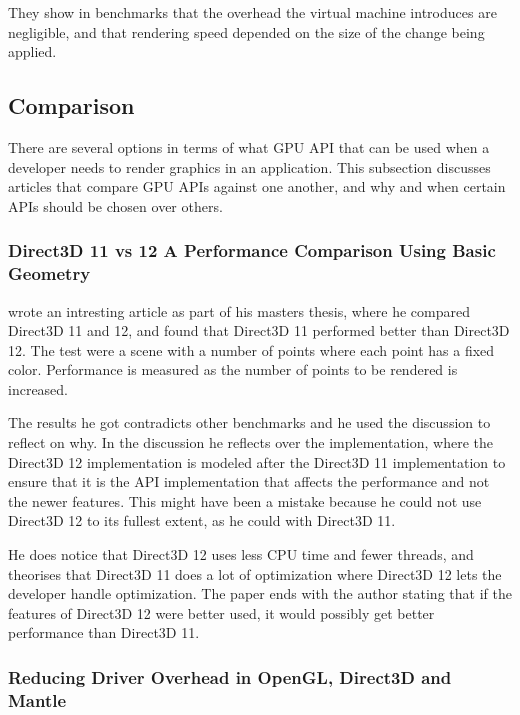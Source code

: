 They show in benchmarks that the overhead the virtual machine introduces are negligible, and that rendering speed depended on the size of the change being applied. 

\subsection{Comparison} 
There are several options in terms of what \gls{GPU} \gls{API} that can be used when a developer needs to render graphics in an application. This subsection discusses articles that compare \gls{GPU} \glspl{API} against one another, and why and when certain \glspl{API} should be chosen over others.

\subsubsection{Direct3D 11 vs 12 A Performance Comparison Using Basic Geometry}

\citet{2016_direct3d} wrote an intresting article as part of his masters thesis, where he compared Direct3D 11 and 12, and found that Direct3D 11 performed better than Direct3D 12.
The test were a scene with a number of points where each point has a fixed color.
Performance is measured as the number of points to be rendered is increased.

The results he got contradicts other benchmarks and he used the discussion to reflect on why.
In the discussion he reflects over the implementation, where the Direct3D 12 implementation is modeled after the Direct3D 11 implementation to ensure that it is the \gls{API} implementation that affects the performance and not the newer features.
This might have been a mistake because he could not use Direct3D 12 to its fullest extent, as he could with Direct3D 11.

He does notice that Direct3D 12 uses less \gls{CPU} time and fewer threads, and theorises that Direct3D 11 does a lot of optimization where Direct3D 12 lets the developer handle optimization.
The paper ends with the author stating that if the features of Direct3D 12 were better used, it would possibly get better performance than Direct3D 11. 

\subsubsection{Reducing Driver Overhead in OpenGL, Direct3D and Mantle}

